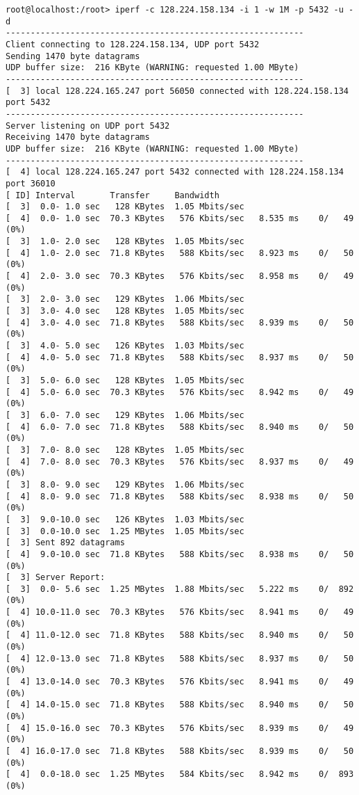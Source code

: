 \documentclass[a4paper]{report}
\begin{document}
\begin{lstlisting}
root@localhost:/root> iperf -c 128.224.158.134 -i 1 -w 1M -p 5432 -u -d
------------------------------------------------------------
Client connecting to 128.224.158.134, UDP port 5432
Sending 1470 byte datagrams
UDP buffer size:  216 KByte (WARNING: requested 1.00 MByte)
------------------------------------------------------------
[  3] local 128.224.165.247 port 56050 connected with 128.224.158.134 port 5432
------------------------------------------------------------
Server listening on UDP port 5432
Receiving 1470 byte datagrams
UDP buffer size:  216 KByte (WARNING: requested 1.00 MByte)
------------------------------------------------------------
[  4] local 128.224.165.247 port 5432 connected with 128.224.158.134 port 36010
[ ID] Interval       Transfer     Bandwidth
[  3]  0.0- 1.0 sec   128 KBytes  1.05 Mbits/sec
[  4]  0.0- 1.0 sec  70.3 KBytes   576 Kbits/sec   8.535 ms    0/   49 (0%)
[  3]  1.0- 2.0 sec   128 KBytes  1.05 Mbits/sec
[  4]  1.0- 2.0 sec  71.8 KBytes   588 Kbits/sec   8.923 ms    0/   50 (0%)
[  4]  2.0- 3.0 sec  70.3 KBytes   576 Kbits/sec   8.958 ms    0/   49 (0%)
[  3]  2.0- 3.0 sec   129 KBytes  1.06 Mbits/sec
[  3]  3.0- 4.0 sec   128 KBytes  1.05 Mbits/sec
[  4]  3.0- 4.0 sec  71.8 KBytes   588 Kbits/sec   8.939 ms    0/   50 (0%)
[  3]  4.0- 5.0 sec   126 KBytes  1.03 Mbits/sec
[  4]  4.0- 5.0 sec  71.8 KBytes   588 Kbits/sec   8.937 ms    0/   50 (0%)
[  3]  5.0- 6.0 sec   128 KBytes  1.05 Mbits/sec
[  4]  5.0- 6.0 sec  70.3 KBytes   576 Kbits/sec   8.942 ms    0/   49 (0%)
[  3]  6.0- 7.0 sec   129 KBytes  1.06 Mbits/sec
[  4]  6.0- 7.0 sec  71.8 KBytes   588 Kbits/sec   8.940 ms    0/   50 (0%)
[  3]  7.0- 8.0 sec   128 KBytes  1.05 Mbits/sec
[  4]  7.0- 8.0 sec  70.3 KBytes   576 Kbits/sec   8.937 ms    0/   49 (0%)
[  3]  8.0- 9.0 sec   129 KBytes  1.06 Mbits/sec
[  4]  8.0- 9.0 sec  71.8 KBytes   588 Kbits/sec   8.938 ms    0/   50 (0%)
[  3]  9.0-10.0 sec   126 KBytes  1.03 Mbits/sec
[  3]  0.0-10.0 sec  1.25 MBytes  1.05 Mbits/sec
[  3] Sent 892 datagrams
[  4]  9.0-10.0 sec  71.8 KBytes   588 Kbits/sec   8.938 ms    0/   50 (0%)
[  3] Server Report:
[  3]  0.0- 5.6 sec  1.25 MBytes  1.88 Mbits/sec   5.222 ms    0/  892 (0%)
[  4] 10.0-11.0 sec  70.3 KBytes   576 Kbits/sec   8.941 ms    0/   49 (0%)
[  4] 11.0-12.0 sec  71.8 KBytes   588 Kbits/sec   8.940 ms    0/   50 (0%)
[  4] 12.0-13.0 sec  71.8 KBytes   588 Kbits/sec   8.937 ms    0/   50 (0%)
[  4] 13.0-14.0 sec  70.3 KBytes   576 Kbits/sec   8.941 ms    0/   49 (0%)
[  4] 14.0-15.0 sec  71.8 KBytes   588 Kbits/sec   8.940 ms    0/   50 (0%)
[  4] 15.0-16.0 sec  70.3 KBytes   576 Kbits/sec   8.939 ms    0/   49 (0%)
[  4] 16.0-17.0 sec  71.8 KBytes   588 Kbits/sec   8.939 ms    0/   50 (0%)
[  4]  0.0-18.0 sec  1.25 MBytes   584 Kbits/sec   8.942 ms    0/  893 (0%)
\end{lstlisting}
\end{document}
